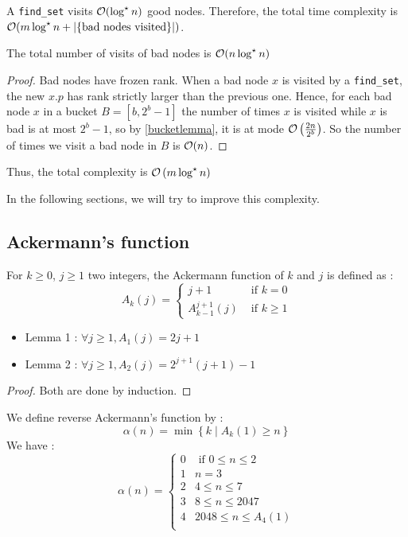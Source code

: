 \documentclass{cours}
\begin{document}
A \texttt{find\_set} visits $\mathcal{O}(\log^{\star} n)$ good nodes. Therefore, the total time complexity is $\mathcal{O}(m\log^{\star} n + \left|\left\{\text{bad nodes visited}\right\}\right|)$. 

\begin{proposition}
    The total number of visits of bad nodes is $\mathcal{O}(n\log^{\star} n)$
\end{proposition}
\begin{proof}
    Bad nodes have frozen rank. When a bad node $x$ is visited by a \texttt{find\_set}, the new $x.p$ has rank strictly larger than the previous one. Hence, for each bad node $x$ in a bucket $B = \left[b, 2^{b}-1\right]$ the number of times $x$ is visited while $x$ is bad is at most $2^{b} - 1$, so by \ref{bucketlemma}, it is at mode $\mathcal{O}\left(\frac{2n}{2^{b}}\right)$. So the number of times we visit a bad node in $B$ is $\mathcal{O}(n)$.
\end{proof}

Thus, the total complexity is $\mathcal{O}\left(m \log^{\star} n\right)$

In the following sections, we will try to improve this complexity. 
\subsection{Ackermann's function}
\begin{definition}
    For $k \geq 0$, $j \geq 1$ two integers, the Ackermann function of $k$ and $j$ is defined as : 
    \[
        A_{k}(j) = \begin{cases}
            j + 1 &\text{ if } k = 0 \\
            A_{k - 1}^{j + 1}(j) &\text{ if } k \geq 1
        \end{cases}
    \]
\end{definition}

\begin{proposition}[Properties]
    \begin{itemize}
        \item Lemma 1 : $\forall j \geq 1, A_{1}(j) = 2j + 1$
        \item Lemma 2 : $\forall j \geq 1, A_{2}(j) = 2^{j + 1}(j + 1) - 1$
    \end{itemize}
\end{proposition}
\begin{proof}
    Both are done by induction.
\end{proof}

\begin{definition}
    We define reverse Ackermann's function by : 
    \[
        \alpha(n) = \min \left\{k \mid A_{k}(1) \geq n\right\}
    \]
    We have : 
    \[
        \alpha(n) = \begin{cases}
            0 & \text{ if } 0 \leq n \leq 2\\
            1 & n = 3\\
            2 & 4 \leq n \leq 7\\
            3 & 8 \leq n \leq 2047\\
            4 & 2048 \leq n \leq A_{4}(1)\\
        \end{cases}    
    \]
\end{definition}
\end{document}
